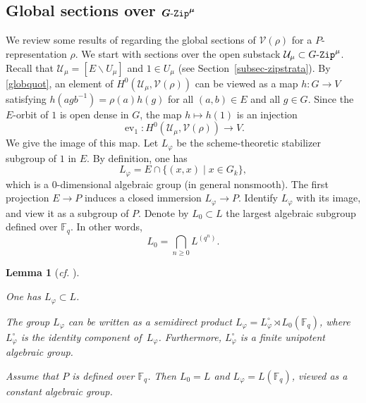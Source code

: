 \documentclass[11pt]{amsart}
\numberwithin{equation}{section}
\newtheorem{lemma}[theorem]{Lemma}
\theoremstyle{definition}
\theoremstyle{remark}
\newcommand{\GZip}{\mathop{\text{$G$-{\tt Zip}}}\nolimits}
\newcommand{\Ucal}{{\mathcal U}}
\newcommand{\Vcal}{{\mathcal V}}
\newcommand{\FF}{\mathbb{F}}
\DeclareMathOperator{\ev}{ev}
\newcommand{\lra}{\longrightarrow}
\begin{document}
\subsection{Global sections over $\boldsymbol{\GZip^\mu}$} \label{subsec-global-sections}
We review some results of \cite{Imai-Koskivirta-vector-bundles} regarding the global sections of $\Vcal(\rho)$ for a $P$-representation $\rho$. We start with sections over the open substack $\Ucal_\mu\subset \GZip^\mu$. Recall that $\Ucal_\mu=[E\backslash U_\mu]$ and $1\in U_\mu$ (see Section~\ref{subsec-zipstrata}). By \eqref{globquot}, an element of $H^0(\Ucal_\mu,\Vcal(\rho))$ can be viewed as a map $h\colon G\to V$ satisfying $h(agb^{-1})=\rho(a)h(g)$ for all $(a,b)\in E$ and all $g\in G$. Since the $E$-orbit of $1$ is open dense in $G$, the map $h\mapsto h(1)$ is an injection
\begin{equation}\label{injection-ev1}
\ev_1 \colon H^0\left(\Ucal_\mu,\Vcal(\rho)\right)\lra V.
\end{equation}
We give the image of this map. Let $L_\varphi$ be the scheme-theoretic stabilizer subgroup of $1$ in $E$. By definition, one has
\begin{equation}\label{Lphi-equ}
L_{\varphi}=E\cap \{(x,x) \mid x\in G_k \}, 
\end{equation}
which is a $0$-dimensional algebraic group (in general nonsmooth). The first projection $E\to P$ induces a closed immersion $L_{\varphi}\to P$. Identify $L_\varphi$ with its image, and view it as a subgroup of $P$. Denote by $L_0\subset L$ the largest algebraic subgroup defined over $\FF_q$. 
In other words,
\begin{equation}\label{eqL0}
    L_0=\bigcap_{n\geq 0}L^{(q^n)}.
\end{equation}

\begin{lemma}[\textit{cf.} {\cite[Lemma 3.2.1]{Koskivirta-Wedhorn-Hasse}}]\label{lemLphi} \leavevmode
\begin{assertionlist}
\item \label{lemLphi-item1} One has $L_{\varphi}\subset L$.
\item \label{lemLphi-item2}  The group $L_{\varphi}$ can be written as a semidirect product $L_{\varphi}=L_{\varphi}^\circ\rtimes L_0(\FF_q)$, where $L_{\varphi}^\circ$ is the identity component of\, $L_{\varphi}$. Furthermore, $L_{\varphi}^\circ$ is a finite unipotent algebraic group.
\item \label{lemLphi-item3}  Assume that $P$ is defined over $\FF_q$. Then $L_0=L$ and $L_{\varphi}=L(\FF_q)$, viewed as a constant algebraic group.
\end{assertionlist}
\end{lemma}
\end{document}
